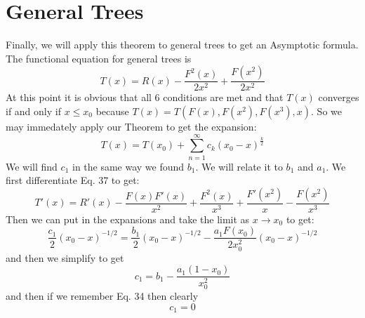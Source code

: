 \documentclass{article}
\begin{document}
 \section{General Trees}
Finally, we will apply this theorem to general trees to get an Asymptotic formula. The functional equation for general trees is
\begin{equation}
T(x)=R(x)-\frac{F^2(x)}{2x^2}+\frac{F(x^2)}{2x^2}
\end{equation}
 At this point it is obvious that all 6 conditions are met and that \(T(x)\) converges if and only if \(x \leq x_0\) because \(T(x)=T(F(x),F(x^2),F(x^3),x)\). So we may immedately apply our Theorem to get the expansion:
\begin{equation}
T(x)=T(x_0)+\sum_{n=1}^\infty c_k(x_0-x)^{\frac{k}{2}}
\end{equation}
We will find \(c_1\) in the same way we found \(b_1\). We will relate it to \( b_1\) and \(a_1\). We first differentiate Eq. 37 to get:
\begin{equation}
T'(x)=R'(x)-\frac{F(x)F'(x)}{x^2}+\frac{F^2(x)}{x^3}+\frac{F'(x^2)}{x}-\frac{F(x^2)}{x^3}
\end{equation}
Then we can put in the expansions and take the limit as \(x \to x_0\) to get:
\[\frac{c_1}{2}(x_0-x)^{-1/2}=\frac{b_1}{2}(x_0-x)^{-1/2}-\frac{a_1F(x_0)}{2x_0^2}(x_0-x)^{-1/2}\]
and then we simplify to get
\[c_1=b_1-\frac{a_1(1-x_0)}{x_0^2}\]
and then if we remember Eq. 34 then clearly
\begin{equation}
c_1=0
\end{equation}
\end{document}
